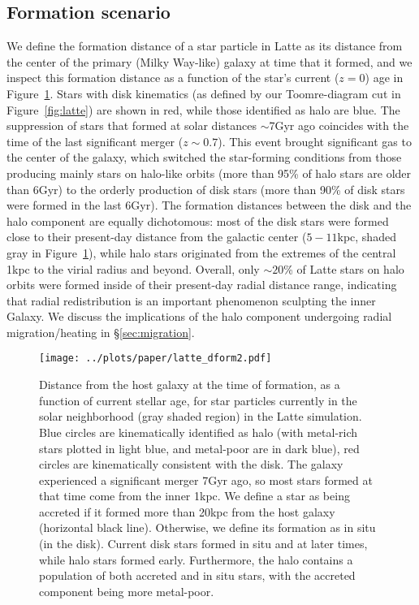 \documentclass[apj, twocolappendix, numberedappendix, appendixfloats]{emulateapj}
\begin{document}
\subsection{Formation scenario}
We define the formation distance of a star particle in Latte as its distance from the center of the primary (Milky Way-like) galaxy at time that it formed, and we inspect this formation distance as a function of the star's current ($z = 0$) age in Figure~\ref{fig:dform}.
Stars with disk kinematics (as defined by our Toomre-diagram cut in Figure~\ref{fig:latte}) are shown in red, while those identified as halo are blue.
The suppression of stars that formed at solar distances $\sim$7\;Gyr ago coincides with the time of the last significant merger ($z\sim0.7$).
This event brought significant gas to the center of the galaxy, which switched the star-forming conditions from those producing mainly stars on halo-like orbits (more than 95\% of halo stars are older than 6\;Gyr) to the orderly production of disk stars (more than 90\% of disk stars were formed in the last 6\;Gyr).
The formation distances between the disk and the halo component are equally dichotomous: most of the disk stars were formed close to their present-day distance from the galactic center ($5-11$\;kpc, shaded gray in Figure~\ref{fig:dform}), while halo stars originated from the extremes of the central 1\;kpc to the virial radius and beyond.
Overall, only $\sim20$\% of Latte stars on halo orbits were formed inside of their present-day radial distance range, indicating that radial redistribution is an important phenomenon sculpting the inner Galaxy.
We discuss the implications of the halo component undergoing radial migration/heating in \S\ref{sec:migration}.

\begin{figure}
\begin{center}
\texttt{[image: ../plots/paper/latte\_dform2.pdf]}
\caption{Distance from the host galaxy at the time of formation, as a function of current stellar age, for star particles currently in the solar neighborhood (gray shaded region) in the Latte simulation.
Blue circles are kinematically identified as halo (with metal-rich stars plotted in light blue, and metal-poor are in dark blue), red circles are kinematically consistent with the disk.
The galaxy experienced a significant merger 7\;Gyr ago, so most stars formed at that time come from the inner 1\;kpc.
We define a star as being accreted if it formed more than 20\;kpc from the host galaxy (horizontal black line).
Otherwise, we define its formation as in situ (in the disk).
Current disk stars formed in situ and at later times, while halo stars formed early.
Furthermore, the halo contains a population of both accreted and in situ stars, with the accreted component being more metal-poor.}
\label{fig:dform}
\end{center}
\end{figure}
\end{document}
